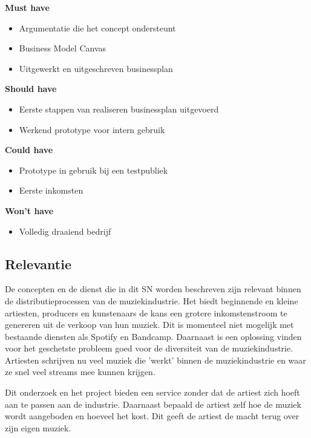 \parbox{\textwidth}{
    \textbf{Must have}
    \begin{itemize}
        \item Argumentatie die het concept ondersteunt
        \item Business Model Canvas
        \item Uitgewerkt en uitgeschreven businessplan
    \end{itemize}
    \textbf{Should have}
    \begin{itemize}
        \item Eerste stappen van realiseren businessplan uitgevoerd
        \item Werkend prototype voor intern gebruik
    \end{itemize}
    \textbf{Could have}
    \begin{itemize}
        \item Prototype in gebruik bij een testpubliek
        \item Eerste inkomsten
    \end{itemize}
    \textbf{Won't have}
    \begin{itemize}
        \item Volledig draaiend bedrijf
    \end{itemize}
}

\subsection{Relevantie}
De concepten en de dienst die in dit SN worden beschreven zijn relevant binnen de distributieprocessen van de muziekindustrie. Het biedt beginnende en kleine artiesten, producers en kunstenaars de kans een grotere inkomstenstroom te genereren uit de verkoop van hun muziek. Dit is momenteel niet mogelijk met bestaande diensten als Spotify en Bandcamp. Daarnaast is een oplossing vinden voor het geschetste probleem goed voor de diversiteit van de muziekindustrie. Artiesten schrijven nu veel muziek die 'werkt' binnen de muziekindustrie en waar ze snel veel streams mee kunnen krijgen.

Dit onderzoek en het project bieden een service zonder dat de artiest zich hoeft aan te passen aan de industrie. Daarnaast bepaald de artiest zelf hoe de muziek wordt aangeboden en hoeveel het kost. Dit geeft de artiest de macht terug over zijn eigen muziek.

